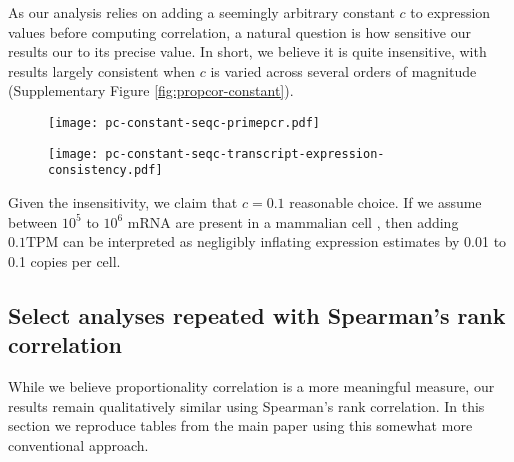 \documentclass{article}
\begin{document}
As our analysis relies on adding a seemingly arbitrary constant $c$ to
expression values before computing correlation, a natural question is how
sensitive our results our to its precise value. In short, we believe it is quite
insensitive, with results largely consistent when $c$ is varied across several
orders of magnitude (Supplementary Figure \ref{fig:propcor-constant}).

\begin{figure*}
    \centering
    \begin{subfigure}[b]{0.8\textwidth}
    \centering
    \texttt{[image: pc-constant-seqc-primepcr.pdf]}
    \caption{}
    \end{subfigure}

    \begin{subfigure}[b]{0.8\textwidth}
    \centering
    \texttt{[image: pc-constant-seqc-transcript-expression-consistency.pdf]}
    \caption{}
    \end{subfigure}

    \caption{To account for zeros and near-zero values, a small constant $c$ is
        added to expression values before computing proportionality correlation.
        Throughout the paper we use $c = 0.1 \text{TPM}$. Here we varied the
        value of $c$ across several orders of magnitude and recomputed
        proportionality correlation in two of the benchmarks used in the paper:
        (a) comparison to PrimePCR qPCR and (b) consistency of transcript
        expression in SEQC data. Though the computed correlation changes
        depending on the value of $c$, methods largely maintain the same order.
    }
    \label{fig:propcor-constant}
\end{figure*}


Given the insensitivity, we claim that $c = 0.1$ reasonable choice. If we assume
between $10^5$ to $10^6$ mRNA are present in a mammalian cell
\cite{Islam:2014is}, then adding $0.1 \text{TPM}$ can be interpreted as
negligibly inflating expression estimates by 0.01 to 0.1 copies per cell.

\subsection{Select analyses repeated with Spearman's rank correlation}\label{spearman-reanalysis}

While we believe proportionality correlation is a more meaningful measure, our
results remain qualitatively similar using Spearman's rank correlation. In this
section we reproduce tables from the main paper using this somewhat more
conventional approach.
\end{document}

